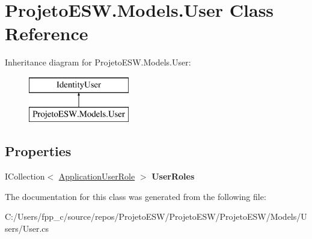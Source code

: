 \hypertarget{class_projeto_e_s_w_1_1_models_1_1_user}{}\section{Projeto\+E\+S\+W.\+Models.\+User Class Reference}
\label{class_projeto_e_s_w_1_1_models_1_1_user}
Inheritance diagram for Projeto\+E\+S\+W.\+Models.\+User\+:\begin{figure}[H]
\begin{center}
\leavevmode
\includegraphics[height=2.000000cm]{class_projeto_e_s_w_1_1_models_1_1_user}
\end{center}
\end{figure}
\subsection*{Properties}
\begin{DoxyCompactItemize}
\item 
\mbox{\label{class_projeto_e_s_w_1_1_models_1_1_user_a8c2a90d8e55f03f7a0edc949a5347e65}} 
I\+Collection$<$ \mbox{\hyperlink{class_projeto_e_s_w_1_1_models_1_1_application_user_role}{Application\+User\+Role}} $>$ {\bfseries User\+Roles}
\end{DoxyCompactItemize}


The documentation for this class was generated from the following file\+:\begin{DoxyCompactItemize}
\item 
C\+:/\+Users/fpp\+\_\+c/source/repos/\+Projeto\+E\+S\+W/\+Projeto\+E\+S\+W/\+Projeto\+E\+S\+W/\+Models/\+Users/User.\+cs\end{DoxyCompactItemize}
